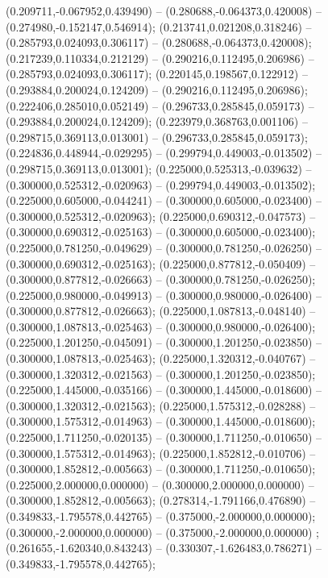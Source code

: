  (0.209711,-0.067952,0.439490) -- (0.280688,-0.064373,0.420008) -- (0.274980,-0.152147,0.546914);
 (0.213741,0.021208,0.318246) -- (0.285793,0.024093,0.306117) -- (0.280688,-0.064373,0.420008);
 (0.217239,0.110334,0.212129) -- (0.290216,0.112495,0.206986) -- (0.285793,0.024093,0.306117);
 (0.220145,0.198567,0.122912) -- (0.293884,0.200024,0.124209) -- (0.290216,0.112495,0.206986);
 (0.222406,0.285010,0.052149) -- (0.296733,0.285845,0.059173) -- (0.293884,0.200024,0.124209);
 (0.223979,0.368763,0.001106) -- (0.298715,0.369113,0.013001) -- (0.296733,0.285845,0.059173);
 (0.224836,0.448944,-0.029295) -- (0.299794,0.449003,-0.013502) -- (0.298715,0.369113,0.013001);
 (0.225000,0.525313,-0.039632) -- (0.300000,0.525312,-0.020963) -- (0.299794,0.449003,-0.013502);
 (0.225000,0.605000,-0.044241) -- (0.300000,0.605000,-0.023400) -- (0.300000,0.525312,-0.020963);
 (0.225000,0.690312,-0.047573) -- (0.300000,0.690312,-0.025163) -- (0.300000,0.605000,-0.023400);
 (0.225000,0.781250,-0.049629) -- (0.300000,0.781250,-0.026250) -- (0.300000,0.690312,-0.025163);
 (0.225000,0.877812,-0.050409) -- (0.300000,0.877812,-0.026663) -- (0.300000,0.781250,-0.026250);
 (0.225000,0.980000,-0.049913) -- (0.300000,0.980000,-0.026400) -- (0.300000,0.877812,-0.026663);
 (0.225000,1.087813,-0.048140) -- (0.300000,1.087813,-0.025463) -- (0.300000,0.980000,-0.026400);
 (0.225000,1.201250,-0.045091) -- (0.300000,1.201250,-0.023850) -- (0.300000,1.087813,-0.025463);
 (0.225000,1.320312,-0.040767) -- (0.300000,1.320312,-0.021563) -- (0.300000,1.201250,-0.023850);
 (0.225000,1.445000,-0.035166) -- (0.300000,1.445000,-0.018600) -- (0.300000,1.320312,-0.021563);
 (0.225000,1.575312,-0.028288) -- (0.300000,1.575312,-0.014963) -- (0.300000,1.445000,-0.018600);
 (0.225000,1.711250,-0.020135) -- (0.300000,1.711250,-0.010650) -- (0.300000,1.575312,-0.014963);
 (0.225000,1.852812,-0.010706) -- (0.300000,1.852812,-0.005663) -- (0.300000,1.711250,-0.010650);
 (0.225000,2.000000,0.000000) -- (0.300000,2.000000,0.000000) -- (0.300000,1.852812,-0.005663);
 (0.278314,-1.791166,0.476890) -- (0.349833,-1.795578,0.442765) -- (0.375000,-2.000000,0.000000);
 (0.300000,-2.000000,0.000000) -- (0.375000,-2.000000,0.000000) ;
 (0.261655,-1.620340,0.843243) -- (0.330307,-1.626483,0.786271) -- (0.349833,-1.795578,0.442765);
